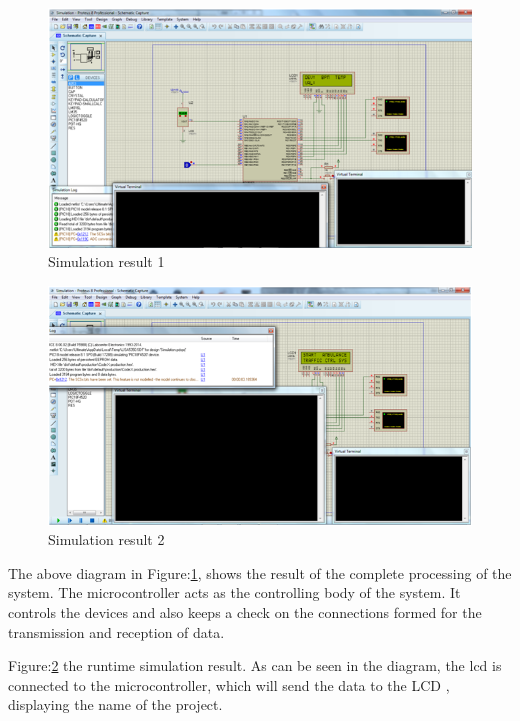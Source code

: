\documentclass[12pt,a4paper,oneside,openright]{report}
\begin{document}
\begin{figure}[!h]
 \centering
 \includegraphics[width = \textwidth]{Figures/31.jpg}
 \caption{Simulation result 1}
 \label{Simulation result 1}
\end{figure}

\begin{figure}[!h]
 \centering
 \includegraphics[width = \textwidth]{Figures/32.jpg}
 \caption{Simulation result 2}
 \label{Simulation result 2}
\end{figure}

The above diagram in Figure:\ref{Simulation result 1}, shows the result of the complete processing of the system. The microcontroller acts as the controlling body of the system. It controls the devices and also keeps a check on the connections formed for the transmission and reception of data.

Figure:\ref{Simulation result 2} the runtime simulation result. As can be seen in the diagram, the lcd is connected to the microcontroller, which will send the data to the LCD , displaying the name of the project. 
\end{document}
